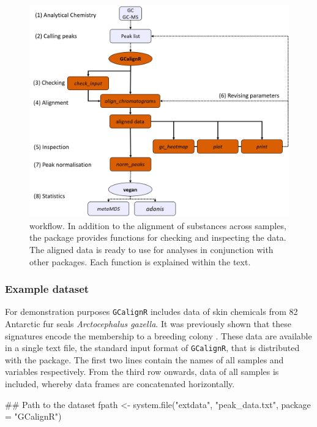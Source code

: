 \begin{figure}[htbp]
\centering
\includegraphics[width=13cm]{figures/workflow}
\caption{ workflow. In addition to the alignment of substances across samples, the package provides functions for checking and inspecting the data. The aligned data is ready to use for analyses in conjunction with other packages. Each function is explained within the text.}
\label{figure:workflow}
\end{figure}

\subsubsection{Example dataset}\label{example-dataset}

For demonstration purposes \texttt{GCalignR} includes data of skin
chemicals from 82 Antarctic fur seals \textit{Arctocephalus gazella}. It
was previously shown that these signatures encode the membership to a
breeding colony \cite{Stoffel.2015}. These data are available in a
single text file, the standard input format of \texttt{GCalignR}, that
is distributed with the package. The first two lines contain the names
of all samples and variables respectively. From the third row onwards,
data of all samples is included, whereby data frames are concatenated
horizontally.

\begin{Schunk}
\begin{Sinput}
## Path to the dataset
fpath <- system.file("extdata", "peak_data.txt", package = "GCalignR")
\end{Sinput}
\end{Schunk}


